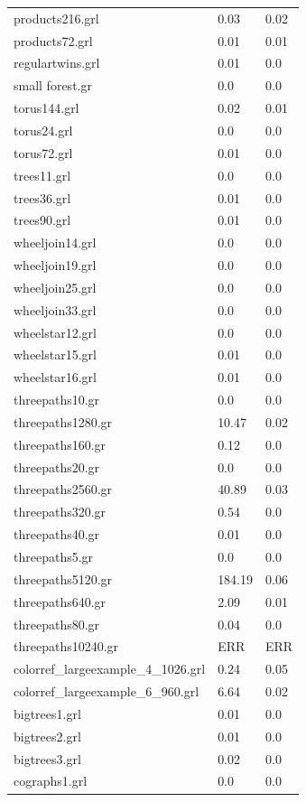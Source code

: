 \documentclass[11pt]{article}
\begin{document}
\begin{table}[h!]
\begin{tabularx}{\textwidth}{|l|X|X|}
		products216.grl & 0.03 & 0.02 \\
		products72.grl & 0.01 & 0.01 \\
		regulartwins.grl & 0.01 & 0.0 \\
		small forest.gr & 0.0 & 0.0 \\
		torus144.grl & 0.02 & 0.01 \\
		torus24.grl & 0.0 & 0.0 \\
		torus72.grl & 0.01 & 0.0 \\
		trees11.grl & 0.0 & 0.0 \\
		trees36.grl & 0.01 & 0.0 \\
		trees90.grl & 0.01 & 0.0 \\
		wheeljoin14.grl & 0.0 & 0.0 \\
		wheeljoin19.grl & 0.0 & 0.0 \\
		wheeljoin25.grl & 0.0 & 0.0 \\
		wheeljoin33.grl & 0.0 & 0.0 \\
		wheelstar12.grl & 0.0 & 0.0 \\
		wheelstar15.grl & 0.01 & 0.0 \\
		wheelstar16.grl & 0.01 & 0.0 \\
		threepaths10.gr & 0.0 & 0.0 \\
		threepaths1280.gr & 10.47 & 0.02 \\
		threepaths160.gr & 0.12 & 0.0 \\
		threepaths20.gr & 0.0 & 0.0 \\
		threepaths2560.gr & 40.89 & 0.03 \\
		threepaths320.gr & 0.54 & 0.0 \\
		threepaths40.gr & 0.01 & 0.0 \\
		threepaths5.gr & 0.0 & 0.0 \\
		threepaths5120.gr & 184.19 & 0.06 \\
		threepaths640.gr & 2.09 & 0.01 \\
		threepaths80.gr & 0.04 & 0.0 \\
		threepaths10240.gr & ERR & ERR \\
		colorref\_largeexample\_4\_1026.grl & 0.24 & 0.05 \\
		colorref\_largeexample\_6\_960.grl & 6.64 & 0.02 \\
		bigtrees1.grl & 0.01 & 0.0 \\
		bigtrees2.grl & 0.01 & 0.0 \\
		bigtrees3.grl & 0.02 & 0.0 \\
		cographs1.grl & 0.0 & 0.0 \\

\end{tabularx}
\end{table}
\end{document}
